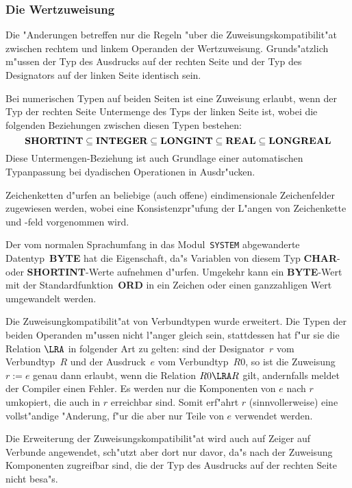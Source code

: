 \subsubsection{Die Wertzuweisung}
\label{Wertzuweisung}

Die "Anderungen betreffen nur die Regeln "uber die Zuweisungskompatibilit"at
zwischen rechtem und linkem Operanden der Wertzuweisung.
Grunds"atzlich m"ussen der Typ des Ausdrucks auf der rechten Seite und
der Typ des Designators auf der linken Seite identisch sein.

Bei numerischen Typen auf beiden Seiten ist eine Zuweisung erlaubt, wenn der
Typ der rechten Seite Untermenge des Typs der linken Seite ist, wobei die
folgenden Beziehungen zwischen diesen Typen bestehen:
\[
  \hbox{\bf SHORTINT}\subseteq\hbox{\bf INTEGER}\subseteq
  \hbox{\bf LONGINT}\subseteq\hbox{\bf REAL}\subseteq
  \hbox{\bf LONGREAL}
\]
Diese Untermengen-Beziehung ist auch Grundlage einer automatischen Typanpassung
bei dyadischen Operationen in Ausdr"ucken.

Zeichenketten d"urfen an beliebige (auch offene) eindimensionale Zeichenfelder
zugewiesen werden, wobei eine Konsistenzpr"ufung der L"angen von Zeichenkette und
-feld vorgenommen wird.

Der vom normalen Sprachumfang in das Modul~{\tt SYSTEM} abgewanderte
Datentyp~{\bf BYTE} hat die Eigenschaft, da"s Variablen von diesem Typ
{\bf CHAR}- oder {\bf SHORTINT}-Werte aufnehmen d"urfen.
Umgekehr kann ein {\bf BYTE}-Wert mit der Standardfunktion~{\bf ORD} in ein
Zeichen oder einen ganzzahligen Wert umgewandelt werden.

Die Zuweisungkompatibilit"at von Verbundtypen wurde erweitert.
Die Typen der beiden Operanden m"ussen nicht l"anger gleich sein,
stattdessen hat f"ur sie die Relation $\LRA$ in folgender Art zu gelten:
sind der Designator~$r$ vom Verbundtyp~$R$ und der Ausdruck~$e$ vom
Verbundtyp~$R0$, so ist die Zuweisung $r:=e$ genau dann erlaubt, wenn die
Relation $R0\LRA R$ gilt, andernfalls meldet der Compiler einen Fehler.
Es werden nur die Komponenten von $e$ nach $r$ umkopiert, die auch in $r$
erreichbar sind.
Somit erf"ahrt $r$ (sinnvollerweise) eine vollst"andige "Anderung, f"ur die aber nur Teile von
$e$ verwendet werden.

Die Erweiterung der Zuweisungskompatibilit"at wird auch auf Zeiger auf Verbunde
angewendet, sch"utzt aber dort nur davor, da"s nach der Zuweisung Komponenten
zugreifbar sind, die der Typ des Ausdrucks auf der rechten Seite nicht besa"s.

